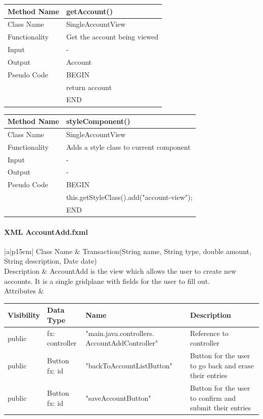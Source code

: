 \documentclass[12pt]{article}
\begin{document}
\begin{tabular}{ |p{3cm}||p{\colWidth}|  }
	\hline
	Method Name &  getAccount()\\
	\hline
	Class Name & SingleAccountView\\
	\hline
	Functionality & Get the account being viewed\\
	\hline
	Input & - \\
	\hline
	Output & Account\\
	\hline
	Pseudo Code&BEGIN\\ & return account\\&END\\
	\hline
\end{tabular}

\begin{tabular}{ |p{3cm}||p{\colWidth}|  }
	\hline
	Method Name &  styleComponent()\\
	\hline
	Class Name & SingleAccountView\\
	\hline
	Functionality &Adds a style class to current component\\
	\hline
	Input & -\\
	\hline
	Output & - \\
	\hline
	Pseudo Code &BEGIN\\& this.getStyleClass().add("account-view");\\&END\\
	\hline
\end{tabular}    

\paragraph{XML AccountAdd.fxml}
\begin{table}[H]
	\begin{tabular}{|a|p{15cm}|}
		\hline
		{Class Name} & {Transaction(String name, String type, double amount, String description, Date date)} \\
		\hline
		Description & AccountAdd is the view which allows the user to create new accounts. It is a single gridplane with fields for the user to fill out.\\
		\hline
		Attributes & 
		\begin{tabular}{| p{1.5cm} | p{2.0cm} | p{6.5cm} | p{3.45cm} |}
			\hline
			\rowcolor{lightgray}
			Visibility & Data Type & Name & Description \\
			\hline
			\rowcolor{white}
			public & fx: controller & "main.java.controllers. AccountAddController" & Reference to controller\\
			\hline
			public & Button fx: id & "backToAccountListButton" & Button for the user to go back and erase their entries\\
			\hline
			public &Button fx: id &  "saveAccountButton"   & Button for the user to confirm and submit their entries\\	
			\hline
		\end{tabular} \\
		\hline								 
	\end{tabular}
\end{table}
\end{document}
